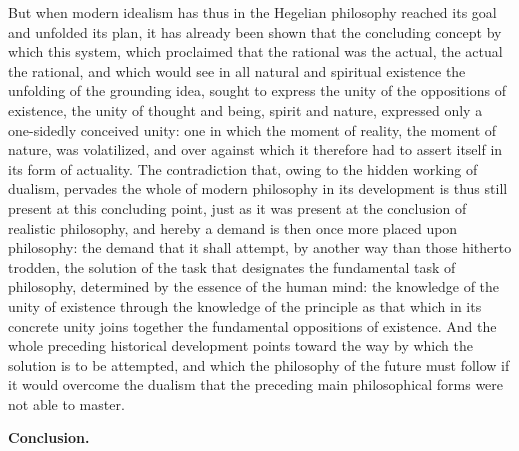 But when modern idealism has thus in the Hegelian philosophy reached
its goal and unfolded its plan, it has already been shown that the
concluding concept by which this system, which proclaimed that the
rational was the actual, the actual the rational, and which would see in
all natural and spiritual existence the unfolding of the grounding
idea, sought to express the unity of the oppositions of existence, the
unity of thought and being, spirit and nature, expressed only a
one-sidedly conceived unity: one in which the moment of reality, the
moment of nature, was volatilized, and over against which
it therefore had to assert itself in its form of actuality.
The contradiction that, owing to the hidden working of dualism, pervades
the whole of modern philosophy in its development is thus still present
at this concluding point, just as it was present at the conclusion of
realistic philosophy, and hereby a demand is then once more placed upon
philosophy: the demand that it shall attempt, by another way than those
hitherto trodden, the solution of the task that designates the
fundamental task of philosophy, determined by the essence of the human
mind: the knowledge of the unity of existence through the knowledge of
the principle as that which in its concrete unity joins together the
fundamental oppositions of existence. And the whole preceding
historical development points toward the way by which the solution is
to be attempted, and which the philosophy of the future must follow if
it would overcome the dualism that the preceding main philosophical
forms were not able to master.

\divrule

\begin{center}
  \textbf{Conclusion.}
\end{center}

\divrule

